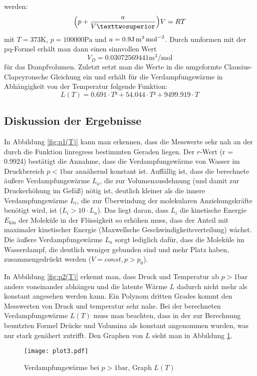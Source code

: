   werden:
  \begin{equation}
    \Bigl(p + \frac{a}{V²}\Bigr)V = R T
  \end{equation} mit $T = 373 \si{\kelvin}$, $p = 100000 \si{\Pa}$ und
  $a = 0.9 \si[per-mode=reciprocal]{\joule\cubic\meter\per\mol\squared}$.
  Durch umformen mit der \\
  pq-Formel erhält man dann einen sinnvollen Wert
  \begin{equation}
    V_D = 0.03072569441 \si{\cubic\meter\per\mol}
  \end{equation} für das Dampfvolumen.
  Zuletzt setzt man die Werte in die umgeformte
  Clausius-Clapeyronsche Gleichung ein und erhält für die Verdampfungswärme in
  Abhängigkeit von der Temperatur folgende Funktion:
  \begin{equation}
    L(T) = 0.691 \cdot T³ + 54.044 \cdot T² + 9499.919 \cdot T
  \end{equation}
  \newpage
  \subsection{Diskussion der Ergebnisse}
  In Abbildung \ref{fig:p1(T)} kann man erkennen, dass die Messwerte sehr nah
  an der durch die Funktion linregress bestimmten Geraden liegen. Der $r$-Wert
  (r = 0.9924) bestätigt die Annahme, dass die Verdampfungswärme von Wasser im
  Druckbereich $p < 1 \si{\bar}$ annähernd konstant ist. Auffällig ist, dass
  die berechnete äußere Verdampfungswärme $L_a$, die zur Volumenausdehnung (und
  damit zur Druckerhöhung im Gefäß) nötig ist, deutlich kleiner als die innere
  Verdampfungswärme $L_i$, die zur Überwindung der molekularen Anziehungskräfte
  benötigt wird, ist ($L_i > 10 \cdot L_a$).
  Das liegt daran, dass $L_i$ die kinetische Energie $E_\text{kin}$ der Moleküle in
  der Flüssigkeit so erhöhen muss, dass der Anteil mit maximaler kinetischer
  Energie (Maxwellsche Geschwindigkeitsverteilung) wächst.
  Die äußere Verdampfungswärme $L_a$ sorgt lediglich dafür, dass die Moleküle
  im Wasserdampf, die deutlich weniger gebunden sind und mehr Platz haben,
  zusammengedrückt werden ($V = const, p > p_0$).

  In Abbildung \ref{fig:p2(T)} erkennt man, dass Druck und Temperatur ab
  $p > 1\si{\bar}$ anders voneinander abhängen und die latente Wärme $L$
  dadurch nicht mehr als konstant angesehen werden kann. Ein Polynom dritten
  Grades kommt den Messwerten von Druck und temperatur sehr nahe.
  Bei der berechneten Verdampfungswärme $L(T)$ muss man beachten, dass in der zur
  Berechnung benutzten Formel Drücke und Volumina als konstant
  angenommen wurden, was nur stark genähert zutrifft. Den Graphen von $L$ sieht
  man in Abbildung \ref{fig:L}.
  \begin{figure}[h]
    \centering
    \texttt{[image: plot3.pdf]}
    \caption{Verdampfungswärme bei $p > 1\si{\bar}$, Graph $L(T)$}
    \label{fig:L}
  \end{figure}

  \newpage
